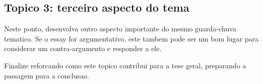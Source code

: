 \subsection{Topico 3: terceiro aspecto do tema}


Neste ponto, desenvolva outro aspecto importante do mesmo guarda-chuva
tematico. Se o essay for argumentativo, este tambem pode ser um bom lugar para
considerar um contra-argumento e responder a ele.

Finalize reforcando como este topico contribui para a tese geral, preparando a
passagem para a conclusao.
